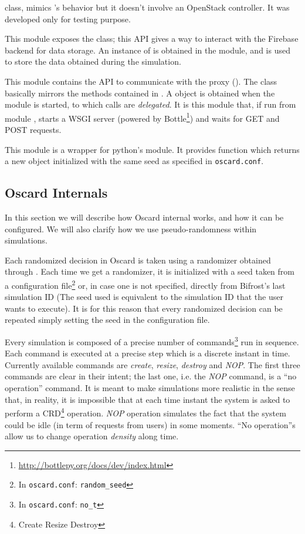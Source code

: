 \begin{description}
	 class, mimics 's behavior but it doesn't involve an OpenStack controller. It was developed only for testing purpose.
	\item[oscard.sim.collector] This module exposes the  class; this API gives a way to interact with the Firebase backend for data storage. An instance of  is obtained in the  module, and is used to store the data obtained during the simulation.
	\item[oscard.sim.proxy] This module contains the API to communicate with the proxy (). The class basically mirrors the methods contained in . A  object is obtained when the module is started, to which calls are \textit{delegated}. It is this module that, if run from module , starts a WSGI server (powered by Bottle\footnote{\url{http://bottlepy.org/docs/dev/index.html}}) and waits for GET and POST requests.
	\item[oscard.randomizer] This module is a wrapper for python's  module. It provides  function which returns a new  object initialized with the same seed as specified in \texttt{oscard.conf}.
\end{description}

\subsection{Oscard Internals}
\label{sub:oscard_internals}
\newcommand{\osconf}[1]{\footnote{In \texttt{oscard.conf}: \texttt{#1}}}

In this section we will describe how Oscard internal works, and how it can be configured. We will also clarify how we use pseudo-randomness within simulations.

Each randomized decision in Oscard is taken using a randomizer obtained through . Each time we get a randomizer, it is initialized with a seed taken from a configuration file\osconf{random\_seed} or, in case one is not specified, directly from Bifrost's last simulation ID (The seed used is equivalent to the simulation ID that the user wants to execute). It is for this reason that every randomized decision can be repeated simply setting the seed in the configuration file.

Every simulation is composed of a precise number of commands\osconf{no\_t} run in sequence. Each command is executed at a precise step which is a discrete instant in time. Currently available commands are \textit{create}, \textit{resize}, \textit{destroy} and \textit{NOP}. The first three commands are clear in their intent; the last one, i.e. the \textit{NOP} command, is a ``no operation'' command. It is meant to make simulations more realistic in the sense that, in reality, it is impossible that at each time instant the system is asked to perform a CRD\footnote{Create Resize Destroy} operation. \textit{NOP} operation simulates the fact that the system could be idle (in term of requests from users) in some moments. ``No operation''s allow us to change operation \textit{density} along time.

